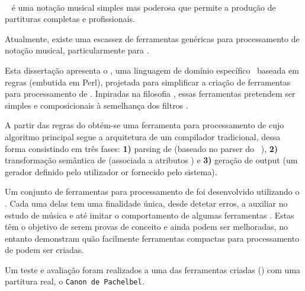 \paragraph{}

\abc{}~\cite{abcnotation:Online} é uma notação musical simples mas poderosa que permite a produção
de partituras completas e profissionais.

Atualmente, existe uma escassez de ferramentas genéricas para processamento de notação musical,
particularmente para \abc{}.

Esta dissertação apresenta o \abcdt{}, uma linguagem de domínio
específico~\cite{kosar2010comparing,kosar2008preliminary} baseada em regras (embutida em Perl),
projetada para simplificar a criação de ferramentas para processamento de \abc{}. Inpiradas na
filosofia \unix{}, essas ferramentas pretendem ser simples e composicionais à semelhança dos filtros
\unix{}.

A partir das regras do \abcdt{} obtém-se uma ferramenta para processamento de \abc{} cujo algoritmo
principal segue a arquitetura de um compilador tradicional, dessa forma consistindo em três fases:
\textbf{1)} parsing de \abc{} (baseado no parser do \abcmtops{}~\cite{abcm2ps:Online}), \textbf{2)}
transformação semântica de \abc{} (associada a atributos \abc{}) e \textbf{3)} geração de output (um
gerador definido pelo utilizador or fornecido pelo sistema).

Um conjunto de ferramentas para processamento de \abc{} foi desenvolvido utilizando o \abcdt{}.
Cada uma delas tem uma finalidade única, desde detetar erros, a auxiliar no estudo de música e até
imitar o comportamento de algumas ferramentas \unix{}. Estas têm o objetivo de serem provas de
conceito e ainda podem ser melhoradas, no entanto demonstram quão facilmente ferramentas compactas
para processamento de \abc{} podem ser criadas.

Um teste e avaliação foram realizados a uma das ferramentas criadas (\canonabc{}) com uma partitura
\abc{} real, o \texttt{Canon de Pachelbel}.
